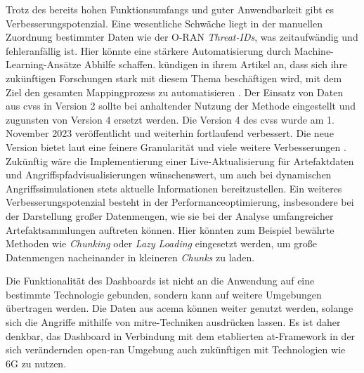 Trotz des bereits hohen Funktionsumfangs und guter Anwendbarkeit gibt es Verbesserungspotenzial. Eine wesentliche Schwäche liegt in der manuellen Zuordnung bestimmter Daten wie der O-RAN \textit{Threat-IDs}, was zeitaufwändig und fehleranfällig ist. Hier könnte eine stärkere Automatisierung durch Machine-Learning-Ansätze Abhilfe schaffen. \citeauthor{klementSecuring6GTransition2024} kündigen in ihrem Artikel an, dass sich ihre zukünftigen Forschungen stark mit diesem Thema beschäftigen wird, mit dem Ziel den gesamten Mappingprozess zu automatisieren \autocite{klementSecuring6GTransition2024}. Der Einsatz von Daten aus \gls{cvss} in Version 2 sollte bei anhaltender Nutzung der Methode eingestellt und zugunsten von Version 4 ersetzt werden. Die Version 4 des \gls{cvss} wurde am 1. November 2023 veröffentlicht und weiterhin fortlaufend verbessert. Die neue Version bietet laut \citeauthor{dugalAnnouncingCVSSV40} eine feinere Granularität und viele weitere Verbesserungen \autocite{dugalAnnouncingCVSSV40}. Zukünftig wäre die Implementierung einer Live-Aktualisierung für Artefaktdaten und Angriffspfadvisualisierungen wünschenswert, um auch bei dynamischen Angriffssimulationen stets aktuelle Informationen bereitzustellen. Ein weiteres Verbesserungspotenzial besteht in der Performanceoptimierung, insbesondere bei der Darstellung großer Datenmengen, wie sie bei der Analyse umfangreicher Artefaktsammlungen auftreten können. Hier könnten zum Beispiel bewährte Methoden wie \textit{Chunking} oder \textit{Lazy Loading} eingesetzt werden, um große Datenmengen nacheinander in kleineren \textit{Chunks} zu laden.
\par Die Funktionalität des Dashboards ist nicht an die Anwendung auf eine bestimmte Technologie gebunden, sondern kann auf weitere Umgebungen übertragen werden. Die Daten aus \gls{acema} können weiter genutzt werden, solange sich die Angriffe mithilfe von \gls{mitre}-Techniken ausdrücken lassen. Es ist daher denkbar, das Dashboard in Verbindung mit dem etablierten \gls{at}-Framework in der sich verändernden \gls{open-ran} Umgebung auch zukünftigen mit Technologien wie 6G zu nutzen.
